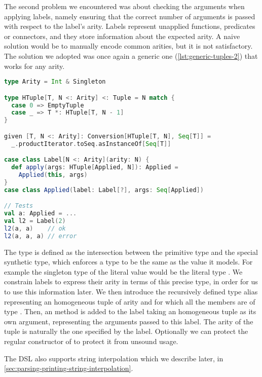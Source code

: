The second problem we encountered was about checking the arguments when applying labels, namely ensuring that the correct number of arguments is passed with respect to the label's arity. Labels represent unapplied functions, predicates or connectors, and they store information about the expected arity. A naive solution would be to manually encode common arities, but it is not satisfactory. The solution we adopted was once again a generic one (\autoref{lst:generic-tuples-2}) that works for any arity.

\begin{lstlisting}[language=Scala,caption={[Generic tuples (2)]{Generic tuples: enforcing correct function application arity. The type \code{HTuble} represents an homogeneous tuple, \code{Label} is a function label and \code{Applied} is an applied function.}},label={lst:generic-tuples-2}]
type Arity = Int & Singleton

type HTuple[T, N <: Arity] <: Tuple = N match {
  case 0 => EmptyTuple
  case _ => T *: HTuple[T, N - 1]
}

given [T, N <: Arity]: Conversion[HTuple[T, N], Seq[T]] =
  _.productIterator.toSeq.asInstanceOf[Seq[T]]

case class Label[N <: Arity](arity: N) {
  def apply(args: HTuple[Applied, N]): Applied =
    Applied(this, args)
}
case class Applied(label: Label[?], args: Seq[Applied])

// Tests
val a: Applied = ...
val l2 = Label(2)
l2(a, a)    // ok
l2(a, a, a) // error
\end{lstlisting}

The type  is defined as the intersection between the primitive  type and the special  synthetic type, which enforces a type to be the same as the value it models. For example the singleton type of the literal value  would be the literal type . We constrain labels to express their arity in terms of this precise type, in order for us to use this information later. We then introduce the recursively defined type alias  representing an homogeneous tuple of arity  and for which all the members are of type . Then, an  method is added to the label taking an homogeneous tuple as its own argument, representing the arguments passed to this label. The arity of the tuple is naturally the one specified by the label. Optionally we can protect the regular constructor of  to protect it from unsound usage.

The DSL also supports string interpolation which we describe later, in \autoref{sec:parsing-printing-string-interpolation}.
